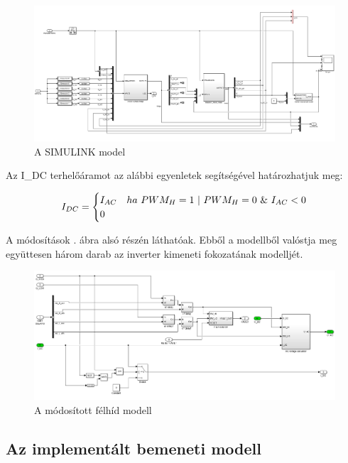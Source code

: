 \begin{figure}[]
	\centering
	\includegraphics[width = \textwidth]{figures/hil_blokkvazlat.png}
	\caption{A SIMULINK model} 
	\label{fig:original_model}
\end{figure}

Az I_{DC} terhelőáramot az alábbi egyenletek segítségével határozhatjuk meg:

\begin{equation}
\centering
$$
I_{DC}
=
\begin{cases}
I_{AC}   & ha \  PWM_H = 1 \  | \  PWM_H = 0 \  \& \  I_{AC} < 0 \\
0 & 
\end{cases}
$$    
\end{equation}

A módosítások . ábra alsó részén láthatóak. Ebből a modellből valóstja meg együttesen három darab az inverter kimeneti fokozatának modelljét. 

\begin{figure}[]
	\centering
	\includegraphics[width = \textwidth]{figures/igbt_model.png}
	\caption{A módosított félhíd modell} 
	\label{fig:igbt_model}
\end{figure}




\subsection{Az implementált bemeneti modell}

